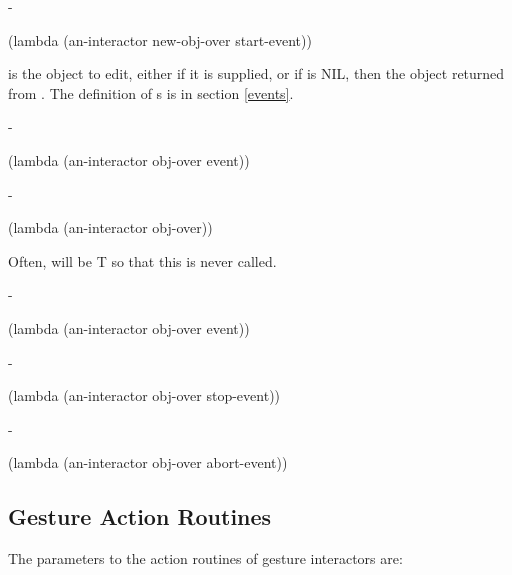 \begin{description}

 -
\begin{programinlist}
(lambda (an-interactor new-obj-over start-event))
\end{programinlist}
 is the
object to edit, either  if it is supplied, or if
 is NIL, then the object returned from .
The definition of s is in section \ref{events}.



 -
\begin{programinlist}
(lambda (an-interactor obj-over event))
\end{programinlist}



 -
\begin{programinlist}
(lambda (an-interactor obj-over))
\end{programinlist}
Often,  will be T so that this is never called.



 -
\begin{programinlist}
(lambda (an-interactor obj-over event))
\end{programinlist}



 -
\begin{programinlist}
(lambda (an-interactor obj-over stop-event))
\end{programinlist}



 -
\begin{programinlist}
(lambda (an-interactor obj-over abort-event))
\end{programinlist}


\end{description}



\subsection{Gesture Action Routines}
\label{gestcustomaction}

The parameters to the action routines of gesture interactors are:

